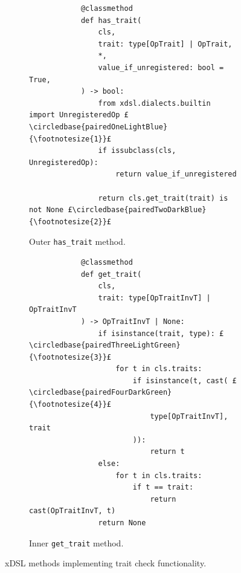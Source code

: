 \begin{figure}[H]
    \begin{subfigure}[b]{0.45\textwidth}
       \centering
        \begin{verbatim}
            @classmethod
            def has_trait(
                cls,
                trait: type[OpTrait] | OpTrait,
                *,
                value_if_unregistered: bool = True,
            ) -> bool:
                from xdsl.dialects.builtin import UnregisteredOp £\circledbase{pairedOneLightBlue}{\footnotesize{1}}£
                if issubclass(cls, UnregisteredOp):
                    return value_if_unregistered

                return cls.get_trait(trait) is not None £\circledbase{pairedTwoDarkBlue}{\footnotesize{2}}£
        \end{verbatim}
        \footnotesize\vspace{1.5em}
        \caption{Outer \texttt{has_trait} method.}
        \label{listing:ubenchmark-trait-checks-xdsl-has}
    \end{subfigure}
    \hfill
    \begin{subfigure}[b]{0.45\textwidth}
        \centering
        \begin{verbatim}
            @classmethod
            def get_trait(
                cls,
                trait: type[OpTraitInvT] | OpTraitInvT
            ) -> OpTraitInvT | None:
                if isinstance(trait, type): £\circledbase{pairedThreeLightGreen}{\footnotesize{3}}£
                    for t in cls.traits:
                        if isinstance(t, cast( £\circledbase{pairedFourDarkGreen}{\footnotesize{4}}£
                            type[OpTraitInvT], trait
                        )):
                            return t
                else:
                    for t in cls.traits:
                        if t == trait:
                            return cast(OpTraitInvT, t)
                return None
        \end{verbatim}
        \caption{Inner \texttt{get_trait} method.}
        \label{listing:ubenchmark-trait-checks-xdsl-get}
    \end{subfigure}
    \vspace{1em}
    \captionsetup{name=Listing}
    \caption{xDSL methods implementing trait check functionality.}
    \label{listing:ubenchmark-trait-checks-xdsl}
\end{figure}

